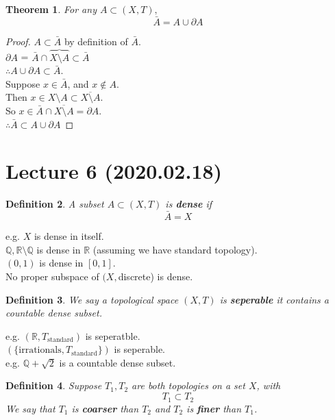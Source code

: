 \documentclass{article}
\newcommand{\R}{\mathbb{R}}
\newcommand{\Q}{\mathbb{Q}}
\newtheorem{stheorem}{Theorem}[theorem]
\newtheorem{sdefinition}[stheorem]{Definition}
\theoremstyle{remark}
\theoremstyle{example}
\theoremstyle{examples}
\begin{document}
	\begin{stheorem}
		For any $A \subset (X,T),$ \[\bar{A} = A \cup \partial A\]
	\end{stheorem}
	\begin{proof}
		$A \subset \bar{A}$ by definition of $\bar{A}$.\\
		$\partial{A}$ = $\bar{A} \cap \overbrace{X \setminus A} \subset \bar{A}$\\
		$\therefore A \cup \partial{A} \subset \bar{A}$.\\
		Suppose $x \in \bar{A}$, and $x \notin A$.\\
		Then $x \in X \setminus A \subset \overline{X \setminus A}$.\\
		So $x \in \bar{A} \cap \overline{X \setminus A} = \partial A$.\\
		$\therefore \bar{A} \subset A \cup \partial A$
	\end{proof}

	\section*{Lecture 6 (2020.02.18)}
	\begin{sdefinition}
		A subset $A \subset(X,T)$ is \textbf{dense} if \[\bar{A}=X\]
	\end{sdefinition}
	e.g. $X$ is dense in itself.\\
	$\Q,\R \setminus \Q$ is dense in $\R$ (assuming we have standard topology).\\
	$(0,1)$ is dense in $[0,1]$.\\
	No proper subspace of $(X,$discrete) is dense.
	
	\begin{sdefinition}
		We say a topological space $(X,T)$ is \textbf{seperable} it contains a countable dense subset.
	\end{sdefinition}
	e.g. $(\R,T_\mathrm{standard})$ is seperatble.\\
	$\left(\{\mathrm{irrationals},T_\mathrm{standard}\}\right)$ is seperable.\\
	e.g. $\Q+\sqrt{2}$ is a countable dense subset.
	
	\begin{sdefinition}
		\label{coarsefine}
		Suppose $T_1, T_2$ are both topologies on a set $X$, with \[T_1 \subset T_2 \]
		We say that $T_1$ is \textbf{coarser} than $T_2$ and $T_2$ is \textbf{finer} than $T_1$.
	\end{sdefinition}

	\addtocounter{subsection}{1}
\end{document}
